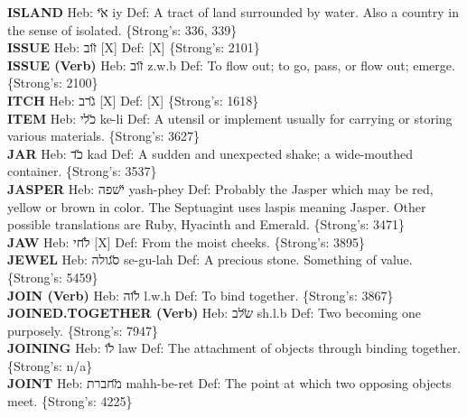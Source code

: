 {\textbf{ISLAND} Heb: {\large\H אי} iy Def: A tract of land surrounded by water. Also a country in the sense of isolated. \{Strong's: 336, 339\}\hfill{}\\

\textbf{ISSUE} Heb: {\large\H זוב} {[}X{]} Def: {[}X{]} \{Strong's: 2101\}\hfill{}\\

\textbf{ISSUE (Verb)} Heb: {\large\H זוב} z.w.b Def: To flow out; to go, pass, or flow out; emerge. \{Strong's: 2100\}\hfill{}\\

\textbf{ITCH} Heb: {\large\H גרב} {[}X{]} Def: {[}X{]} \{Strong's: 1618\}\hfill{}\\

\textbf{ITEM} Heb: {\large\H כלי} ke-li Def: A utensil or implement usually for carrying or storing various materials. \{Strong's: 3627\}\hfill{}\\

\textbf{JAR} Heb: {\large\H כד} kad Def: A sudden and unexpected shake; a wide-mouthed container. \{Strong's: 3537\}\hfill{}\\

\textbf{JASPER} Heb: {\large\H ישפה} yash-phey Def: Probably the Jasper which may be red, yellow or brown in color. The Septuagint uses laspis meaning Jasper. Other possible translations are Ruby, Hyacinth and Emerald. \{Strong's: 3471\}\hfill{}\\

\textbf{JAW} Heb: {\large\H לחי} {[}X{]} Def: From the moist cheeks. \{Strong's: 3895\}\hfill{}\\

\textbf{JEWEL} Heb: {\large\H סגולה} se-gu-lah Def: A precious stone. Something of value. \{Strong's: 5459\}\hfill{}\\

\textbf{JOIN (Verb)} Heb: {\large\H לוה} l.w.h Def: To bind together. \{Strong's: 3867\}\hfill{}\\

\textbf{JOINED.TOGETHER (Verb)} Heb: {\large\H שלב} sh.l.b Def: Two becoming one purposely. \{Strong's: 7947\}\hfill{}\\

\textbf{JOINING} Heb: {\large\H לו} law Def: The attachment of objects through binding together. \{Strong's: n/a\}\hfill{}\\

\textbf{JOINT} Heb: {\large\H מחברת} mahh-be-ret Def: The point at which two opposing objects meet. \{Strong's: 4225\}\hfill{}\\

}
